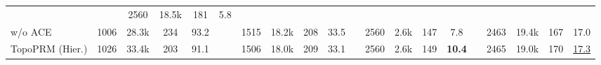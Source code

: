 \begin{table}[!htb]
{\begin{tabular}{@{}l cccc c cccc c cccc c cccc@{}}
  && 2560          & 18.5k          & 181          & 5.8 \\
w/o ACE
  & 1006          & 28.3k          & 234          & 93.2
  && 1515          & 18.2k          & 208          & 33.5
  && 2560          & 2.6k           & 147          & 7.8
  && 2463          & 19.4k          & 167          & 17.0 \\
\rowcolor{blue!5}
TopoPRM (Hier.)
  & 1026          & 33.4k          & 203          & 91.1
  && 1506          & 18.0k          & 209          & 33.1
  && 2560          & 2.6k           & 149          & \textbf{10.4}
  && 2465          & 19.0k          & 170          & \underline{17.3} \\
\bottomrule
\end{tabular}%
}
\end{table}
